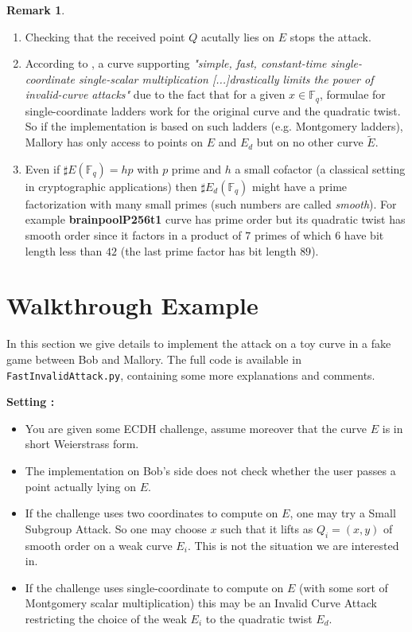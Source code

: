 \documentclass[10pt]{article}
\theoremstyle{definition}
\newtheorem{remark}{Remark}
\newcommand{\F}{\mathbb{F}}
\begin{document}
\begin{remark}
\begin{enumerate}
\item Checking that the received point $Q$ acutally lies on $E$ stops the attack.
\item According to \cite{cryptoeprint:2024/1265}, a curve supporting \textsl{"simple, fast, constant-time single-coordinate single-scalar multiplication [...]drastically limits the power of invalid-curve attacks"} due to the fact that for a given $x \in \F_q$, formulae for single-coordinate ladders work for the original curve and the quadratic twist.
So if the implementation is based on such ladders (e.g. Montgomery ladders), Mallory has only access to points on $E$ and $E_d$ but on no other curve $\tilde{E}$.
\item Even if $\sharp{} E(\F_q) = hp$ with $p$ prime and $h$ a small cofactor (a classical setting in cryptographic applications) then $\sharp{}E_d(\F_q)$ might have a prime factorization with many small primes (such numbers are called \textsl{smooth}).
For example \textbf{brainpoolP256t1} curve has prime order but its quadratic twist has smooth order since it factors in a product of $7$ primes of which $6$ have bit length less than $42$ (the last prime factor has bit length $89$).
\end{enumerate}
\end{remark}

\section{Walkthrough Example}

In this section we give details to implement the attack on a toy curve in a fake game between Bob and Mallory.
The full code is available in \verb|FastInvalidAttack.py|, containing some more explanations and comments.

\vspace*{.5cm}
\textbf{Setting :} 
\begin{itemize}
\item You are given some ECDH challenge, assume moreover that the curve $E$ is in short Weierstrass form.
\item The implementation on Bob's side does not check whether the user passes a point actually lying on $E$.
\item If the challenge uses two coordinates to compute on $E$, one may try a Small Subgroup Attack.
So one may choose $x$ such that it lifts as $Q_i=(x,y)$ of smooth order on a weak curve $E_i$.
This is not the situation we are interested in.
\item If the challenge uses single-coordinate to compute on $E$ (with some sort of Montgomery scalar multiplication) this may be an Invalid Curve Attack restricting the choice of the weak $E_i$ to the quadratic twist $E_d$.
\end{itemize}
\end{document}
